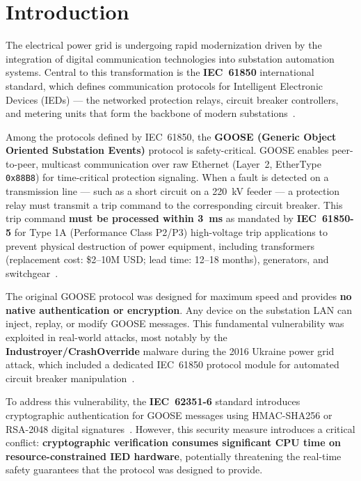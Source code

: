 \documentclass[12pt,a4paper]{article}
\begin{document}
\section{Introduction}

The electrical power grid is undergoing rapid modernization driven by the integration of digital communication technologies into substation automation systems. Central to this transformation is the \textbf{IEC~61850} international standard, which defines communication protocols for Intelligent Electronic Devices (IEDs) --- the networked protection relays, circuit breaker controllers, and metering units that form the backbone of modern substations~\cite{iec61850}.

Among the protocols defined by IEC~61850, the \textbf{GOOSE (Generic Object Oriented Substation Events)} protocol is safety-critical. GOOSE enables peer-to-peer, multicast communication over raw Ethernet (Layer~2, EtherType \texttt{0x88B8}) for time-critical protection signaling. When a fault is detected on a transmission line --- such as a short circuit on a 220~kV feeder --- a protection relay must transmit a trip command to the corresponding circuit breaker. This trip command \textbf{must be processed within 3~ms} as mandated by \textbf{IEC~61850-5} for Type 1A (Performance Class P2/P3) high-voltage trip applications to prevent physical destruction of power equipment, including transformers (replacement cost: \$2--10M USD; lead time: 12--18 months), generators, and switchgear~\cite{sel_relay, iec61850}.

The original GOOSE protocol was designed for maximum speed and provides \textbf{no native authentication or encryption}. Any device on the substation LAN can inject, replay, or modify GOOSE messages. This fundamental vulnerability was exploited in real-world attacks, most notably by the \textbf{Industroyer/CrashOverride} malware during the 2016 Ukraine power grid attack, which included a dedicated IEC~61850 protocol module for automated circuit breaker manipulation~\cite{industroyer, ukraine2015}.

To address this vulnerability, the \textbf{IEC~62351-6} standard introduces cryptographic authentication for GOOSE messages using HMAC-SHA256 or RSA-2048 digital signatures~\cite{iec62351}. However, this security measure introduces a critical conflict: \textbf{cryptographic verification consumes significant CPU time on resource-constrained IED hardware}, potentially threatening the real-time safety guarantees that the protocol was designed to provide.
\end{document}
